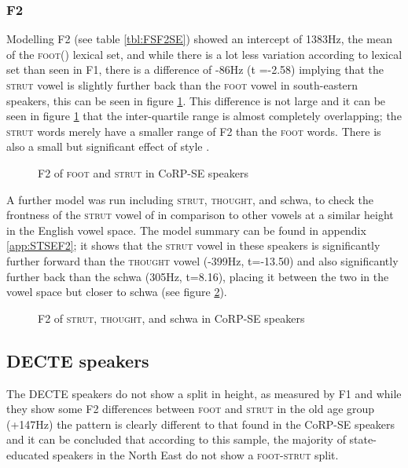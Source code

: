 \documentclass[12pt,a4paper,notitlepage,
bibliography=totoc,
numbers=endperiod,
appendixprefix=true,
usenames,dvipsnames]{scrartcl}
\let\Oldsubsection\subsection
\renewcommand{\subsection}{\FloatBarrier\Oldsubsection}
\let\Oldsubsubsection\subsubsection
\renewcommand{\subsubsection}{\FloatBarrier\Oldsubsubsection}
\newcommand{\scs}{\textsc}
\newcommand{\foot}{\scs{foot}}
\newcommand{\strutt}{\scs{strut}}
\newcommand{\FS}{\scs{foot}-\scs{strut}}
\begin{document}
\subsubsection{F2} \label{subsubsec:SEF2}
Modelling F2 (see table \ref{tbl:FSF2SE}) showed an intercept of 1383Hz, the mean of the \foot() lexical set, and while there is a lot less variation according to lexical set than seen in F1, there is a difference of -86Hz (t =-2.58) implying that the \strutt{} vowel is slightly further back than the \foot{} vowel in south-eastern speakers, this can be seen in figure \ref{fig:FSF2SE}. This difference is not large and it can be seen in figure \ref{fig:FSF2SE} that the inter-quartile range is almost completely overlapping; the \strutt{} words merely have a smaller range of F2 than the \foot{} words.
There is also a small but significant effect of style .



\begin{figure}[h]
	
	\caption{F2 of \foot{} and \strutt{} in CoRP-SE speakers} \label{fig:FSF2SE}
\end{figure}

A further model was run including \strutt{}, \scs{thought}, and schwa, to check  the frontness of the \strutt{} vowel of in comparison to other vowels at a similar height in the English vowel space. The model summary can be found in appendix \ref{app:STSEF2}; it shows that the \strutt{} vowel in these speakers is significantly further forward than the \scs{thought} vowel (-399Hz, t=-13.50) and also significantly further back than the schwa (305Hz, t=8.16), placing it between the two in the vowel space but closer to schwa (see figure \ref{fig:STF2SE}).

\begin{figure}[h]
	
	\caption{F2 of \strutt{}, \scs{thought}, and schwa in CoRP-SE speakers} \label{fig:STF2SE}
\end{figure}



\subsection{DECTE speakers}
The DECTE speakers do not show a split in height, as measured by F1 and while they show some F2 differences between \foot{} and \strutt{} in the old age group (+147Hz) the pattern is clearly different to that found in the CoRP-SE speakers and it can be concluded that according to this sample, the majority of state-educated speakers in the North East do not show a \FS{} split.
\end{document}
